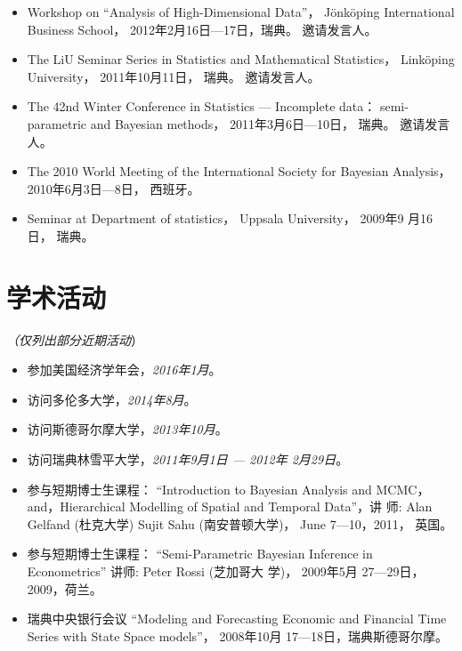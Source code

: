 \documentclass[twoside,a4paper,10pt]{amsart}
\begin{document}
\begin{itemize}
\item Workshop on ``Analysis of High-Dimensional Data''，
  Jönköping International Business School， 2012年2月16日---17日，瑞典。
  邀请发言人。

\item The LiU Seminar Series in Statistics and Mathematical Statistics，
  Linköping University， 2011年10月11日， 瑞典。 邀请发言人。

\item The 42nd Winter Conference in Statistics --- Incomplete data：
  semi-parametric and Bayesian methods， 2011年3月6日---10日，
  瑞典。 邀请发言人。

\item The 2010 World Meeting of the International Society for Bayesian
  Analysis， 2010年6月3日---8日， 西班牙。

\item Seminar at Department of statistics， Uppsala University， 2009年9
  月16日， 瑞典。

\end{itemize}


\section*{学术活动}
\emph{（仅列出部分近期活动}）

\begin{itemize}
\item 参加美国经济学年会，\emph{2016年1月}。
\item 访问多伦多大学，\emph{2014年8月}。
\item 访问斯德哥尔摩大学，\emph{2013年10月}。

\item 访问瑞典林雪平大学，\emph{2011年9月1日 --- 2012年 2月29日}。

\item 参与短期博士生课程： ``Introduction to Bayesian Analysis and
  MCMC， and，Hierarchical Modelling of Spatial and Temporal Data''，讲
  师: Alan Gelfand (杜克大学) Sujit Sahu (南安普顿大学)， June
  7---10，2011， 英国。

\item 参与短期博士生课程： ``Semi-Parametric Bayesian Inference in
  Econometrics'' 讲师: Peter Rossi (芝加哥大
  学)， 2009年5月 27---29日，2009，荷兰。

\item 瑞典中央银行会议 ``Modeling and Forecasting Economic and
  Financial Time Series with State Space
  models''， 2008年10月 17---18日，瑞典斯德哥尔摩。
\end{itemize}
\end{document}
